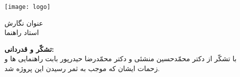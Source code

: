 \begin{center}
\thispagestyle{empty}
\texttt{[image: logo]} \\
\begin{Large}
\end{Large}
\vskip 3cm
\large{عنوان}  
\vskip 0.4cm
\textbf{\huge{\fatitle}}
\vskip 2cm
\large{نگارش} \\  \Large{\faAuthor}
\vskip 4cm
\large{استاد راهنما} \\ \Large{\fasupervisor}
\vskip 3cm
\large{\fadate}
\end{center}

\pagebreak
\thispagestyle{empty}
\hspace{0pt}
\vfill
\noindent \textbf{تشکّر و قدردانی:}\\

\large{با تشکّر از دکتر محمّدحسین منشئی و دکتر محمّدرضا حیدرپور بابت  راهنمایی  ها و زحمات ایشان که موجب به ثمر رسیدن این پروژه شد.}
\vfill
\hspace{0pt}
\pagebreak